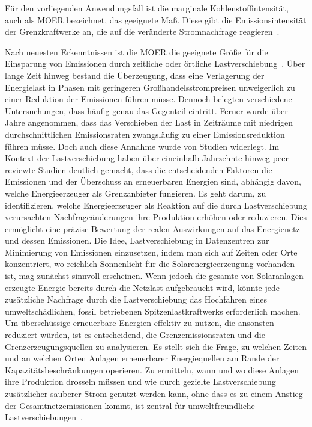 Für den vorliegenden Anwendungsfall ist die marginale Kohlenstoffintensität, auch als \ac{MOER} bezeichnet, das geeignete Maß.
Diese gibt die Emissionsintensität der Grenzkraftwerke an, die auf die veränderte Stromnachfrage reagieren~\cite{Buchanan.2023}.

Nach neuesten Erkenntnissen ist die \ac{MOER} die geeignete Größe für die Einsparung von Emissionen durch zeitliche oder örtliche Lastverschiebung~\cite{Schram.03.05.201905.05.2019}\cite{WattTime.12.3.2024}.
Über lange Zeit hinweg bestand die Überzeugung, dass eine Verlagerung der Energielast in Phasen mit geringeren Großhandelsstrompreisen unweigerlich zu einer Reduktion der Emissionen führen müsse.
Dennoch belegten verschiedene Untersuchungen, dass häufig genau das Gegenteil eintritt.
Ferner wurde über Jahre angenommen, dass das Verschieben der Last in Zeiträume mit niedrigen durchschnittlichen Emissionsraten zwangsläufig zu einer Emissionsreduktion führen müsse.
Doch auch diese Annahme wurde von Studien widerlegt.
Im Kontext der Lastverschiebung haben über eineinhalb Jahrzehnte hinweg peer-reviewte Studien deutlich gemacht, dass die entscheidenden Faktoren die Emissionen und der Überschuss an erneuerbaren Energien sind, abhängig davon, welche Energieerzeuger als Grenzanbieter fungieren.
Es geht darum, zu identifizieren, welche Energieerzeuger als Reaktion auf die durch Lastverschiebung verursachten Nachfrageänderungen ihre Produktion erhöhen oder reduzieren.
Dies ermöglicht eine präzise Bewertung der realen Auswirkungen auf das Energienetz und dessen Emissionen.
Die Idee, Lastverschiebung in Datenzentren zur Minimierung von Emissionen einzusetzen, indem man sich auf Zeiten oder Orte konzentriert, wo reichlich Sonnenlicht für die Solarenergieerzeugung vorhanden ist, mag zunächst sinnvoll erscheinen.
Wenn jedoch die gesamte von Solaranlagen erzeugte Energie bereits durch die Netzlast aufgebraucht wird, könnte jede zusätzliche Nachfrage durch die Lastverschiebung das Hochfahren eines umweltschädlichen, fossil betriebenen Spitzenlastkraftwerks erforderlich machen.
Um überschüssige erneuerbare Energien effektiv zu nutzen, die ansonsten reduziert würden, ist es entscheidend, die Grenzemissionsraten und die Grenzerzeugungsquellen zu analysieren.
Es stellt sich die Frage, zu welchen Zeiten und an welchen Orten Anlagen erneuerbarer Energiequellen am Rande der Kapazitätsbeschränkungen operieren.
Zu ermitteln, wann und wo diese Anlagen ihre Produktion drosseln müssen und wie durch gezielte Lastverschiebung zusätzlicher sauberer Strom genutzt werden kann, ohne dass es zu einem Anstieg der Gesamtnetzemissionen kommt, ist zentral für umweltfreundliche Lastverschiebungen~\cite{WattTime.12.3.2024}.

